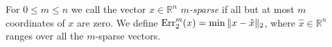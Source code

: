 For $0\le m\le n$ we call the vector $x\in\mathbb R^n$ {\em $m$-sparse} if
all but at most $m$ coordinates of $x$ are zero. We define
$\operatorname{Err}_2^m(x)=\min\|x-\hat x\|_2$, where $\hat x\in\mathbb R^n$ ranges over all
the $m$-sparse vectors.




